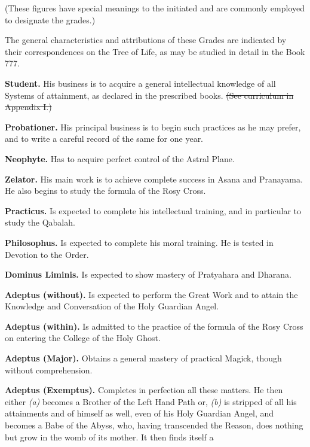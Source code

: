 (These figures have special meanings to the initiated and are commonly employed to designate the grades.)

The general characteristics and attributions of these Grades are indicated by their correspondences on the Tree of Life, as may be studied in detail in the Book 777.

\textbf{Student.} \textemdash{} His business is to acquire a general intellectual knowledge of all Systems of attainment, as declared in the prescribed books. \sout{(See curriculum in Appendix I.)}

\textbf{Probationer.} \textemdash{} His principal business is to begin such practices as he may prefer, and to write a careful record of the same for one year.

\textbf{Neophyte.} \textemdash{} Has to acquire perfect control of the Astral Plane.

\textbf{Zelator.} \textemdash{} His main work is to achieve complete success in Asana and Pranayama. He also begins to study the formula of the Rosy Cross.

\textbf{Practicus.} \textemdash{} Is expected to complete his intellectual training, and in particular to study the Qabalah.

\textbf{Philosophus.} \textemdash{} Is expected to complete his moral training. He is tested in Devotion to the Order.

\textbf{Dominus Liminis.} \textemdash{} Is expected to show mastery of Pratyahara and Dharana.

\textbf{Adeptus (without).} \textemdash{} Is expected to perform the Great Work and to attain the Knowledge and Conversation of the Holy Guardian Angel.

\textbf{Adeptus (within).} \textemdash{} Is admitted to the practice of the formula of the Rosy Cross on entering the College of the Holy Ghost.

\textbf{Adeptus (Major).} \textemdash{} Obtains a general mastery of practical Magick, though without comprehension.

\textbf{Adeptus (Exemptus).} \textemdash{} Completes in perfection all these matters. He then either \textit{(a)} becomes a Brother of the Left Hand Path or, \textit{(b)}  is stripped of all his attainments and of himself as well, even of his Holy Guardian Angel, and becomes a Babe of the Abyss, who, having transcended the Reason, does nothing but grow in the womb of its mother. It then finds itself a

